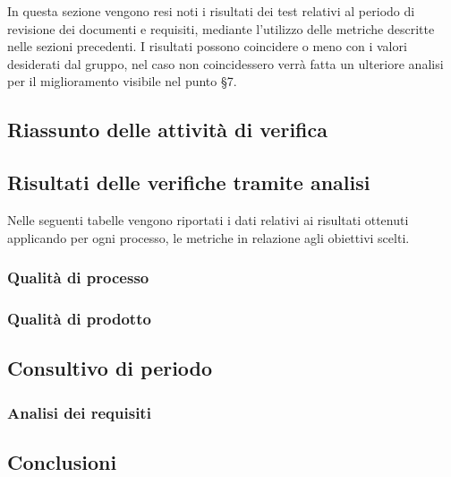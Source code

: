 \documentclass[../piano-di-qualifica.tex]{subfiles}
\begin{document}
In questa sezione vengono resi noti i risultati dei test relativi al periodo di revisione dei documenti e requisiti, mediante l'utilizzo delle metriche descritte nelle sezioni precedenti.
I risultati possono coincidere o meno con i valori desiderati dal gruppo, nel caso non coincidessero verrà fatta un ulteriore analisi per il miglioramento visibile nel punto §7.

\subsection{Riassunto delle attività di verifica}%
\label{sub:iso/riassunto_delle_attivita_di_verifica}


\subsection{Risultati delle verifiche tramite analisi}%
\label{sub:iso/risultati_delle_verifiche_tramite_analisi}
Nelle seguenti tabelle vengono riportati i dati relativi ai risultati ottenuti applicando per ogni processo, le metriche in relazione agli obiettivi scelti.

\subsubsection{Qualità di processo}
\label{sub:qualita_di_processo}

\subsubsection{Qualità di prodotto}
\label{sub:qualita_di_prodotto}

\subsection{Consultivo di periodo}%
\label{sub:consultivo_di_periodo}

\subsubsection{Analisi dei requisiti}
\label{sub:analisi dei requisiti}

\subsection{Conclusioni}%
\label{sub:conclusioni}
\end{document}
